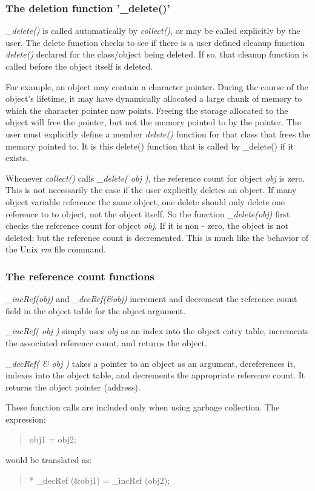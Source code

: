 \subsubsection{The deletion function '\_delete()'}
{\em \_delete()} is called automatically by {\em collect()}, or may be called
explicitly by the user.
The delete function checks to see if there is a user defined
cleanup function {\em delete()} declared for the class/object being deleted.
If so, that cleanup function is called before the object itself is deleted.

For example, an object may contain a character pointer.  During the course
of the object's lifetime, it may have dynamically allocated a large chunk
of memory to which the character pointer now points.  Freeing the storage
allocated to the object will free the pointer, but not the memory pointed
to by the pointer.  The user must explicitly define a member {\em delete()}
function for that class that frees the memory pointed to.  It is this
delete() function that is called by \_delete() if it exists.

Whenever {\em collect()} calls {\em \_delete( obj )}, the reference count for
object {\em obj} is zero.  This is not necessarily the case if the user
explicitly deletes an object.  If many object variable reference the same
object, one delete should only delete one reference to to object, not
the object itself.  So the function {\em \_delete(obj)} first checks
the reference count for object {\em obj}.  If it is non - zero, the
object is not deleted; but the reference count is decremented.  This is
much like the behavior of the Unix {\em rm} file command.

\subsubsection{The reference count functions}
{\em \_incRef(obj)} and {\em \_decRef(\&obj)} increment and decrement
the reference count field in the object table for the object argument.

{\em \_incRef( obj )} simply uses {\em obj} as an index into the
object entry table, increments the associated reference count, and
returns the object.

{\em \_decRef( \& obj )} takes a pointer to an object as an argument,
dereferences
it, indexes into the object table, and decrements the appropriate reference
count.  It returns the object pointer (address).

These function calls are included only when using garbage collection.  The
expression:
\begin{quote} obj1 = obj2; \end{quote}
would be translated as:
\begin{quote}
* \_decRef (\&obj1) = \_incRef (obj2);
\end{quote}

